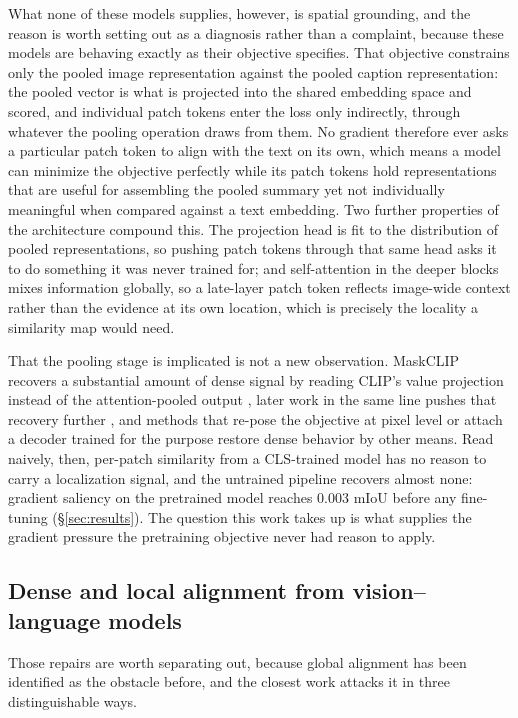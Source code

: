 What none of these models supplies, however, is spatial grounding, and the
reason is worth setting out as a diagnosis rather than a complaint, because
these models are behaving exactly as their objective specifies. That objective
constrains only the pooled image representation against the pooled caption
representation: the pooled vector is what is projected into the shared embedding
space and scored, and individual patch tokens enter the loss only indirectly,
through whatever the pooling operation draws from them. No gradient therefore
ever asks a particular patch token to align with the text on its own, which
means a model can minimize the objective perfectly while its patch tokens hold
representations that are useful for assembling the pooled summary yet not
individually meaningful when compared against a text embedding. Two further
properties of the architecture compound this. The projection head is fit to the
distribution of pooled representations, so pushing patch tokens through that
same head asks it to do something it was never trained for; and self-attention
in the deeper blocks mixes information globally, so a late-layer patch token
reflects image-wide context rather than the evidence at its own location, which
is precisely the locality a similarity map would need.

That the pooling stage is implicated is not a new observation. MaskCLIP
recovers a substantial amount of dense signal by reading CLIP's value projection
instead of the attention-pooled output \cite{zhou2022maskclip}, later work in
the same line pushes that recovery further \cite{yang2025clipdense}, and
methods that re-pose the objective at pixel level \cite{rao2022denseclip} or
attach a decoder trained for the purpose \cite{lueddecke2022clipseg} restore
dense behavior by other means. Read naively, then, per-patch similarity from a
CLS-trained model has no reason to carry a localization signal, and the
untrained pipeline recovers almost none: gradient saliency on the pretrained
model reaches 0.003 mIoU before any fine-tuning (\S\ref{sec:results}). The
question this work takes up is what supplies the gradient pressure the
pretraining objective never had reason to apply.

\subsection{Dense and local alignment from vision--language models}

Those repairs are worth separating out, because global alignment has been
identified as the obstacle before, and the closest work attacks it in three
distinguishable ways.

